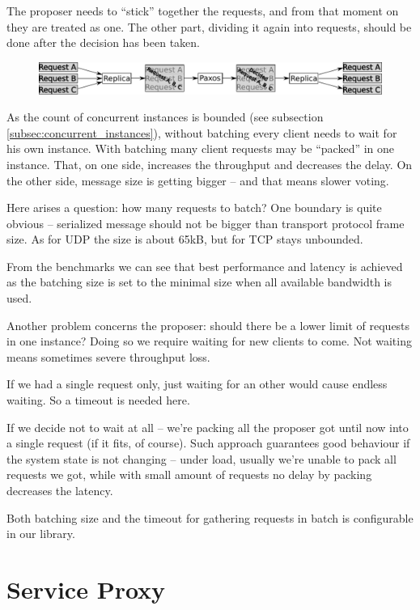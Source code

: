 The proposer needs to ``stick'' together the requests, and from that moment on they are treated as one. The other part, dividing it again into requests, should be done after the decision has been taken.
\begin{figure}[h]
\includegraphics[keepaspectratio, width=\textwidth]{features/batching.pdf}
\end{figure}

As the count of concurrent instances is bounded (see subsection \ref{subsec:concurrent_instances}), without batching every client needs to wait for his own instance. With batching many client requests may be ``packed'' in one instance. That, on one side, increases the throughput and decreases the delay.
On the other side, message size is getting bigger -- and that means slower voting.

Here arises a question: how many requests to batch? One boundary is quite obvious -- serialized message should not be bigger than transport protocol frame size. As for UDP the size is about 65kB, but for TCP stays unbounded.

From the benchmarks %
we can see that best performance and latency is achieved as the batching size is set to the minimal size when all available bandwidth is used.

Another problem concerns the proposer: should there be a lower limit of requests in one instance? Doing so we require waiting for new clients to come. Not waiting means sometimes severe throughput loss.

If we had a single request only, just waiting for an other would cause endless waiting. So a timeout is needed here.

If we decide not to wait at all -- we're packing all the proposer got until now into a single request (if it fits, of course). Such approach guarantees good behaviour if the system state is not changing -- under load, usually we're unable to pack all requests we got, while with small amount of requests no delay by packing decreases the latency.

Both batching size and the timeout for gathering requests in batch is configurable in our library.

\section{Service Proxy}
\label{sec:serviceProxy}

